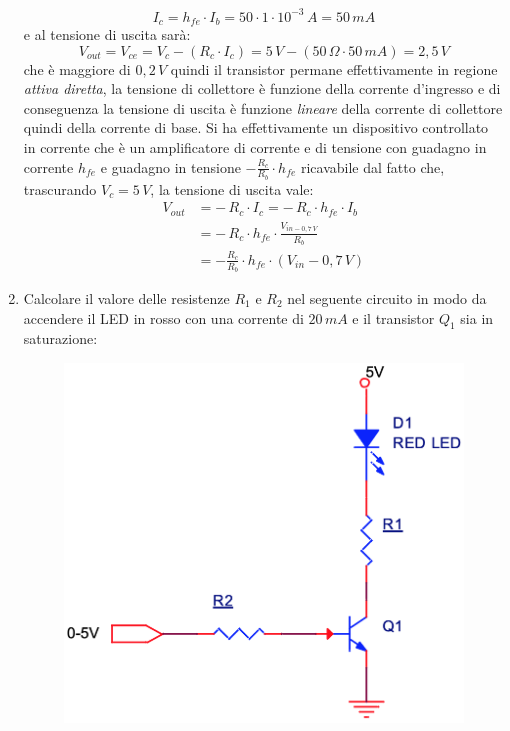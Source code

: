\documentclass[12pt, a4paper]{report}
\begin{document}
\begin{appendices}
\begin{enumerate}
    \begin{equation*}
        I_{c} = h_{fe} \cdot I_{b} = 50 \cdot 1 \cdot 10^{-3}\,A = 50\,mA
    \end{equation*}
    e al tensione di uscita sarà:
    \begin{equation*}
        V_{out} = V_{ce} = V_{c} - (R_{c} \cdot I_{c}) = 5\,V - (50\,\Omega \cdot 50\,mA) = 2,5\,V
    \end{equation*}
    che è maggiore di $0,2\,V$ quindi il transistor permane effettivamente in regione \textit{attiva diretta}, la tensione di collettore è funzione della corrente d'ingresso e di conseguenza la tensione di uscita è funzione \textit{lineare} della corrente di collettore quindi della corrente di base. Si ha effettivamente un dispositivo controllato in corrente che è un amplificatore di corrente e di tensione con guadagno in corrente $h_{fe}$ e guadagno in tensione $-\frac{R_c}{R_b} \cdot h_{fe}$ ricavabile dal fatto che, trascurando $V_{c} = 5\,V$, la tensione di uscita vale:
    \begin{align*}
        V_{out} &= -\,R_{c} \cdot I_{c} = -\,R_{c} \cdot h_{fe} \cdot I_{b}\\ &= -\,R_{c} \cdot h_{fe} \cdot \frac{V_{in - 0,7\,V}}{R_{b}}\\
        &= -\frac{R_c}{R_b} \cdot h_{fe} \cdot (V_{in} - 0,7\,V)
    \end{align*}
    \item Calcolare il valore delle resistenze $R_1$ e $R_2$ nel seguente circuito in modo da accendere il LED in rosso con una corrente di $20\,mA$ e il transistor $Q_1$ sia in saturazione:
    \begin{figure}[h]
        \centering
       \includegraphics[scale=0.3,angle=0]{bjt_es2.png}

\end{figure}
\end{enumerate}
\end{appendices}
\end{document}
